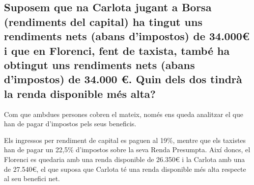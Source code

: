 \subsection{Suposem que na Carlota jugant a Borsa (rendiments del capital) 
ha tingut uns rendiments nets (abans d’impostos) de 34.000€ i 
que en Florenci, fent de taxista, també ha obtingut uns rendiments 
nets (abans d’impostos) de 34.000 €.
Quin dels dos tindrà la renda disponible més alta?}

Com que ambdues persones cobren el mateix, només ens queda analitzar
el que han de pagar d'impostos pels seus beneficis.

Els ingressos per rendiment de capital es paguen al 
19\%\cite{eleconomista_rendimiento_capital}, mentre que els taxistes 
han de pagar un 22,5\%\cite{sii_preguntas_frecuentes} d'impostos sobre 
la seva 
Renda Presumpta. Així doncs, el Florenci es quedaria amb una renda 
disponible de 26.350€ i la Carlota amb una de 27.540€, el que suposa que 
Carlota té una renda disponible més alta respecte al seu benefici net.

